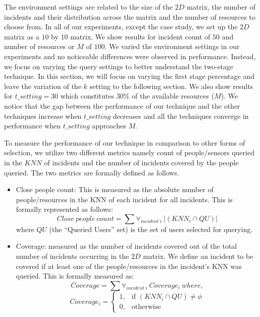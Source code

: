 \documentclass{acm_proc_article-sp}
\begin{document}
The environment settings are related to the size of the $2D$ matrix, the number of incidents and their distribution across the matrix and the number of resources to choose from. In all of our experiments, except the case study, we set up the $2D$ matrix as a $10$ by $10$ matrix. We show results for incident count of $50$ and  number of resources or $M$ of $100$. We varied the environment settings in our experiments and no noticeable differences were observed in performance. Instead, we focus on varying the query settings to better understand the two-stage technique. In this section, we will focus on varying the first stage percentage and leave the variation of the $k$ setting to the following section. We also show results for $t\_setting = 30$ which constitutes $30\%$ of the available resources ($M$). We notice that the gap between the performance of our technique and the other techniques increase when $t\_setting$ decreases and all the techniques converge in performance when $t\_setting$ approaches $M$. \par
 To measure the performance of our technique in comparison to other forms of selection, we utilize two different metrics namely count of people/sensors queried in the $KNN$ of incidents and the number of incidents covered by the people queried. The two metrics are formally defined as follows.
\begin{itemize}
\item Close people count: This is measured as the absolute number of people/resources in the KNN of each incident for all incidents. This is formally represented as follows:
\begin{equation}
Close\ people\ count = \sum \forall_{incident\ i}\ |(KNN_i \cap {QU})|
\end{equation}
where $QU$ (the ``Queried Users'' set) is the set of users selected for querying.
\item Coverage: measured as the number of incidents covered out of the total number of incidents occurring in the $2D$ matrix. We define an incident to be covered if at least one of the people/resources in the incident's KNN was queried. This is formally measured as:
\begin{equation}
Coverage = \sum \forall_{incident\ i}\ Coverage_i\  where,
\end{equation}
\[
   Coverage_i =
\begin{cases}
   1,& \text{if }(KNN_i \cap {QU}) \neq \phi\\
   0,              & \text{otherwise}
\end{cases}
\]
\end{itemize} 
\end{document}
